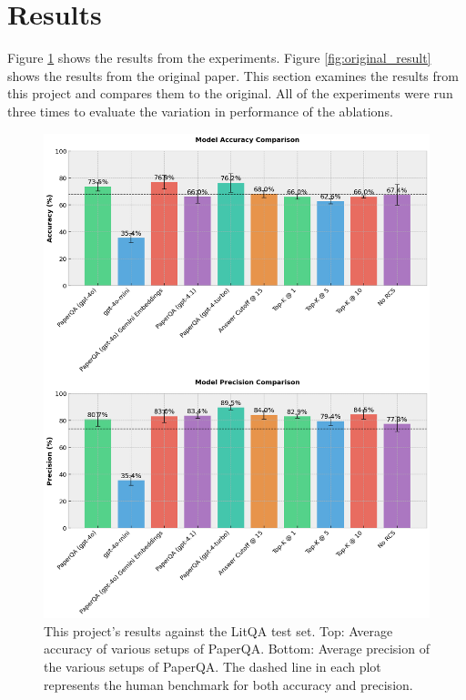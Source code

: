 \section{Results}
\label{sec:results}

Figure \ref{fig:main_result} shows the results from the experiments. Figure \ref{fig:original_result} shows the results from the original paper. This section examines the results from this project and compares them to the original. All of the experiments were run three times to evaluate the variation in performance of the ablations. 

\begin{figure}[H]
    \centering
    \includegraphics[width=\textwidth]{figures/main_result.png}
    \caption{This project's results against the LitQA test set. Top: Average accuracy of various setups of PaperQA. Bottom: Average precision of the various setups of PaperQA. The dashed line in each plot represents the human benchmark for both accuracy and precision.}
    \label{fig:main_result}
\end{figure}


